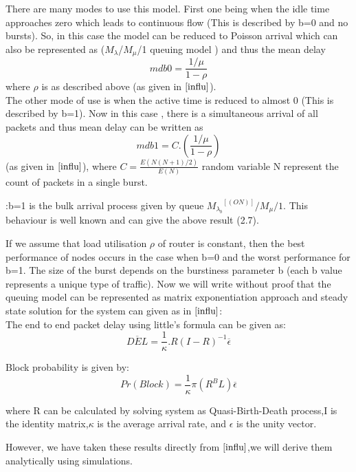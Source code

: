 There are many modes to use this model. First one being when the idle time approaches zero which leads to continuous flow (This is described by b=0 and no bursts). So, in this case the model can be reduced to Poisson arrival which can also be represented as ($M_{\lambda}$/$M_{\mu}$/1 queuing model ) and thus the mean delay
\begin{equation}
    mdb0 = \frac{1/{\mu}}{1-\rho}
\end{equation}
 where $\rho$ is as described above (as given in $\cite{influ}$).\\
The other mode of use is when the active time is reduced to almost 0 (This is described by b=1). Now in this case , there is a simultaneous arrival of all packets and thus mean delay can be written as
\begin{equation}
 mdb1 = C.(\frac{1/{\mu}}{1-\rho})   
\end{equation}
(as given in $\cite{influ}$), where $ C = \frac{E(N(N+1)/2)}{E(N)}$ random variable N represent the count of packets in a single burst.\\

\begin{remark}
:b=1 is the bulk arrival process given by queue ${M_{\lambda_{b}}}^{[(ON)]}/M_{\mu}/1$. This behaviour is well known and can give the above result (2.7).
\end{remark}


If we assume that load utilisation $\rho$ of router is constant, then the best performance of nodes occurs in the case when b=0  and the worst performance for b=1. The size of the burst depends on the burstiness parameter b (each b value represents a unique type of traffic). Now we will write without proof that the queuing model can be represented as matrix exponentiation approach and steady state solution for the system can given as in $\cite{influ}$:\\
The end to end packet delay using little's formula can be given as:\\
\begin{equation}
\overline{DEL} = \frac{1}{\kappa}.R(I-R)^{-1}\overline{\epsilon}
\end{equation}
 
Block probability is given by:\\
\begin{equation}
Pr(Block) = \frac{1}{\kappa}{\pi}{(R^{B}L)}\overline{\epsilon}
\end{equation}

where  R can be calculated by solving system as Quasi-Birth-Death process,I is the identity matrix,$\kappa$ is the average arrival rate, and $\epsilon$ is the unity vector.


\begin{remark}
However, we have taken these results directly from $\cite{influ}$,we will derive them analytically using simulations.\\
\end{remark}


 

